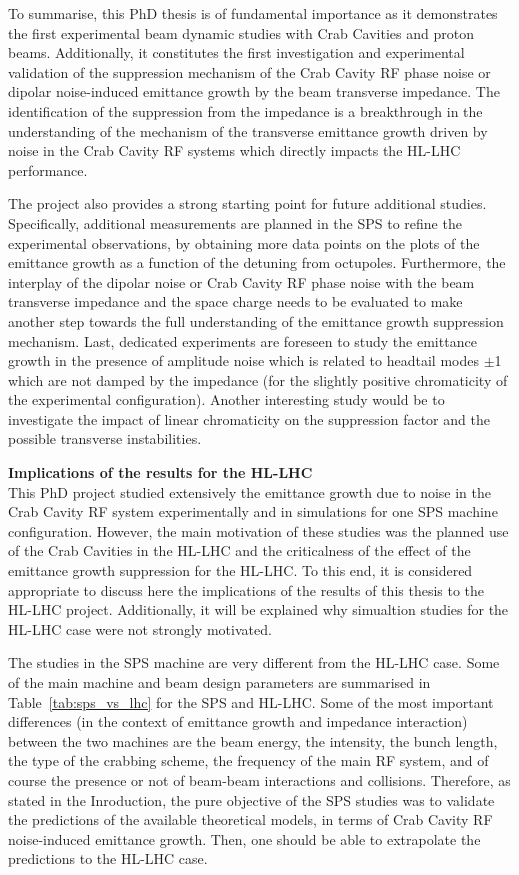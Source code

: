 To summarise, this PhD thesis is of fundamental importance as it demonstrates the first experimental beam dynamic studies with Crab Cavities and proton beams. Additionally, it constitutes the first investigation and experimental validation of the suppression mechanism of the Crab Cavity RF phase noise or dipolar noise-induced emittance growth by the beam transverse impedance. The identification of the suppression from the impedance is a breakthrough in the understanding of the mechanism of the transverse emittance growth driven by noise in the Crab Cavity RF systems which directly impacts the HL-LHC performance.

The project also provides a strong starting point for future additional studies.
Specifically, additional measurements are planned in the SPS to refine the experimental observations, by obtaining more data points on the plots of the emittance growth as a function of the detuning from octupoles. Furthermore, the interplay of the dipolar noise or Crab Cavity RF phase noise with the beam transverse impedance and the space charge needs to be evaluated to make another step towards the full understanding of the emittance growth suppression mechanism. Last, dedicated experiments are foreseen to study the emittance growth in the presence of amplitude noise which is related to headtail modes $\pm$1 which are not damped by the impedance (for the slightly positive chromaticity of the experimental configuration). Another interesting study would be to investigate the impact of linear chromaticity on the suppression factor and the possible transverse instabilities.

\textbf{Implications of the results for the HL-LHC}\\
This PhD project studied extensively the emittance growth due to noise in the Crab Cavity RF system experimentally and in simulations for one SPS machine configuration. However, the main motivation of these studies was the planned use of the Crab Cavities in the HL-LHC and the criticalness of the effect of the emittance growth suppression for the HL-LHC. To this end, it is considered appropriate to discuss here the implications of the results of this thesis to the HL-LHC project. Additionally, it will be explained why simualtion studies for the HL-LHC case were not strongly motivated.

The studies in the SPS machine are very different from the HL-LHC case. Some of the main machine and beam design parameters are summarised in Table~\ref{tab:sps_vs_lhc} for the SPS and HL-LHC. Some of the most important differences (in the context of emittance growth and impedance interaction) between the two machines are the beam energy, the intensity, the bunch length, the type of the crabbing scheme, the frequency of the main RF system, and of course the presence or not of beam-beam interactions and collisions. Therefore, as stated in the Inroduction, the pure objective of the SPS studies was to validate the predictions of the available theoretical models, in terms of Crab Cavity RF noise-induced emittance growth. Then, one should be able to extrapolate the predictions to the HL-LHC case.

